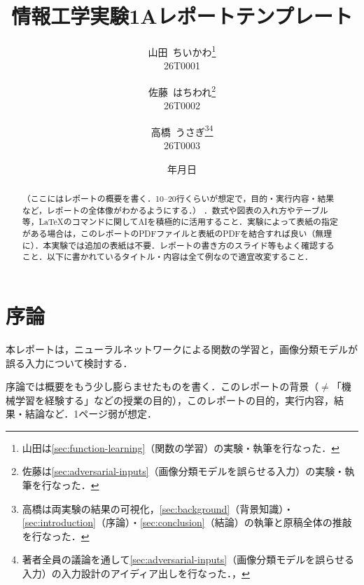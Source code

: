 \documentclass[a4paper,11pt]{article}
\begin{document}
\title{情報工学実験1Aレポートテンプレート}

\author{
    山田\ ちいかわ\thanks{山田は\cref{sec:function-learning}（関数の学習）の実験・執筆を行なった．}\\{\small 26T0001}
    \and
    佐藤\ はちわれ\thanks{佐藤は\cref{sec:adversarial-inputs}（画像分類モデルを誤らせる入力）の実験・執筆を行なった．}\\{\small 26T0002}
    \and
    高橋\ うさぎ\thanks{高橋は両実験の結果の可視化，\cref{sec:background}（背景知識）・\cref{sec:introduction}（序論）・\cref{sec:conclusion}（結論）の執筆と原稿全体の推敲を行なった．}\hspace{0.6em}\thanks{著者全員の議論を通して\cref{sec:adversarial-inputs}（画像分類モデルを誤らせる入力）の入力設計のアイディア出しを行なった．，}\\{\small 26T0003}
}
\date{\number\year 年\number\month 月\number\day 日}

\maketitle

\begin{abstract}
（ここにはレポートの概要を書く．10--20行くらいが想定で，目的・実行内容・結果など，レポートの全体像がわかるようにする．）
．数式や図表の入れ方やテーブル等，\LaTeX のコマンドに関してAIを積極的に活用すること．実験によって表紙の指定がある場合は，このレポートのPDFファイルと表紙のPDFを結合すれば良い（無理に）．本実験では追加の表紙は不要．レポートの書き方のスライド等もよく確認すること．以下に書かれているタイトル・内容は全て例なので適宜改変すること．
\end{abstract}


\section{序論}\label{sec:introduction}
本レポートは，ニューラルネットワークによる関数の学習と，画像分類モデルが誤る入力について検討する．

序論では概要をもう少し膨らませたものを書く．このレポートの背景（$\ne$「機械学習を経験する」などの授業の目的），このレポートの目的，実行内容，結果・結論など．1ページ弱が想定．
\end{document}
